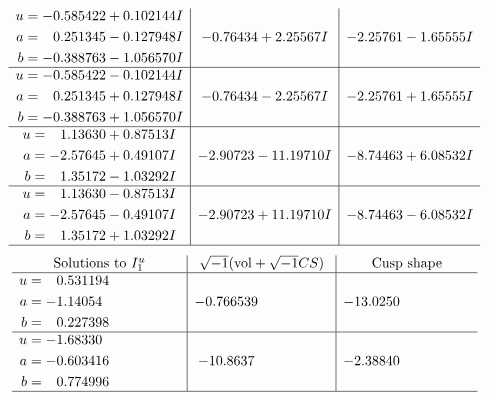\documentclass[1p]{elsarticle_modified}
\theoremstyle{definition}
\newcommand{\I}{\sqrt{-1}}
\begin{document}
$$\begin{array}{c|c|c}
\begin{aligned}
u &= -0.585422 + 0.102144 I \\
a &= \phantom{-}0.251345 - 0.127948 I \\
b &= -0.388763 - 1.056570 I\end{aligned}
 & -0.76434 + 2.25567 I & -2.25761 - 1.65555 I \\ \hline\begin{aligned}
u &= -0.585422 - 0.102144 I \\
a &= \phantom{-}0.251345 + 0.127948 I \\
b &= -0.388763 + 1.056570 I\end{aligned}
 & -0.76434 - 2.25567 I & -2.25761 + 1.65555 I \\ \hline\begin{aligned}
u &= \phantom{-}1.13630 + 0.87513 I \\
a &= -2.57645 + 0.49107 I \\
b &= \phantom{-}1.35172 - 1.03292 I\end{aligned}
 & -2.90723 - 11.19710 I & -8.74463 + 6.08532 I \\ \hline\begin{aligned}
u &= \phantom{-}1.13630 - 0.87513 I \\
a &= -2.57645 - 0.49107 I \\
b &= \phantom{-}1.35172 + 1.03292 I\end{aligned}
 & -2.90723 + 11.19710 I & -8.74463 - 6.08532 I\\
 \hline 
 \end{array}$$\newpage$$\begin{array}{c|c|c}  
\text{Solutions to }I^u_{1}& \I (\text{vol} + \sqrt{-1}CS) & \text{Cusp shape}\\
 \hline 
\begin{aligned}
u &= \phantom{-}0.531194\phantom{ +0.000000I} \\
a &= -1.14054\phantom{ +0.000000I} \\
b &= \phantom{-}0.227398\phantom{ +0.000000I}\end{aligned}
 & -0.766539\phantom{ +0.000000I} & -13.0250\phantom{ +0.000000I} \\ \hline\begin{aligned}
u &= -1.68330\phantom{ +0.000000I} \\
a &= -0.603416\phantom{ +0.000000I} \\
b &= \phantom{-}0.774996\phantom{ +0.000000I}\end{aligned}
 & -10.8637\phantom{ +0.000000I} & -2.38840\phantom{ +0.000000I}\\
 \hline 
 \end{array}$$\newpage\newpage\renewcommand{\arraystretch}{1}
\end{document}
